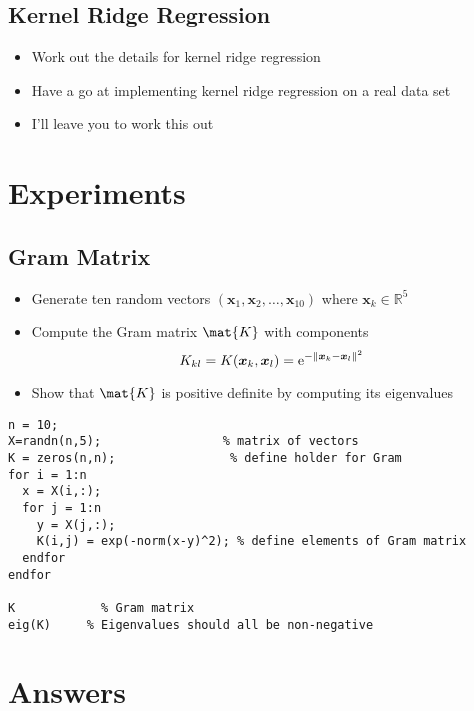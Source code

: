 \documentclass[11pt]{article}
\newcommand{\e}[1]{{\rm e}^{#1}}
\begin{document}
\subsection{Kernel Ridge Regression}
\label{sec:org3d018d0}
\begin{itemize}
\item Work out the details for kernel ridge regression
\item Have a go at implementing kernel ridge regression on a real data set
\item I'll leave you to work this out
\end{itemize}

\section{Experiments}
\label{sec:org13a65d8}

\subsection{Gram Matrix}
\label{sec:org65672f5}
\begin{itemize}
\item Generate ten random vectors \((\bm{x}_1,\bm{x}_2, \ldots,
     \bm{x}_{10})\) where \(\bm{x}_k \in \mathbb{R}^5\)
\item Compute the Gram matrix \(\mat{K}\) with components
$$ K_{kl} = K(\bm{x}_k,\bm{x}_l) = \e{-\|\bm{x}_k-\bm{x}_l\|^2} $$
\item Show that \(\mat{K}\) is positive definite by computing its
eigenvalues
\end{itemize}
\begin{verbatim}
n = 10;
X=randn(n,5);                 % matrix of vectors
K = zeros(n,n);                % define holder for Gram
for i = 1:n
  x = X(i,:);
  for j = 1:n
    y = X(j,:);
    K(i,j) = exp(-norm(x-y)^2); % define elements of Gram matrix
  endfor
endfor

K            % Gram matrix
eig(K)     % Eigenvalues should all be non-negative
\end{verbatim}

\section{Answers}
\label{sec:org7aa8700}
\end{document}

